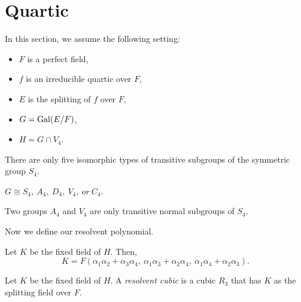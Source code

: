 \documentclass{../note}
\begin{document}
\section{Quartic}
In this section, we assume the following setting:
\begin{itemize}
\item $F$ is a perfect field, %
\item $f$ is an irreducible quartic over $F$,
\item $E$ is the splitting of $f$ over $F$,
\item $G=\operatorname{Gal}(E/F)$,
\item $H=G\cap V_4$. 
\end{itemize}
\begin{thm}
There are only five isomorphic types of transitive subgroups of the symmetric group $S_4$.
\end{thm}
\begin{cor}
$G\cong S_4,\ A_4,\ D_4,\ V_4,\ or\ C_4$.
\end{cor}
\begin{prop}
Two groups $A_4$ and $V_4$ are only transitive normal subgroups of $S_4$.
\end{prop}

Now we define our resolvent polynomial.
\begin{prop}
Let $K$ be the fixed field of $H$.
Then,
\[K=F(\alpha_1\alpha_2+\alpha_3\alpha_4,\ \alpha_1\alpha_3+\alpha_2\alpha_4,\ \alpha_1\alpha_4+\alpha_2\alpha_3).\]
\end{prop}
\begin{defn}
Let $K$ be the fixed field of $H$.
A \emph{resolvent cubic} is a cubic $R_3$ that has $K$ as the splitting field over $F$.
\end{defn}
\end{document}
